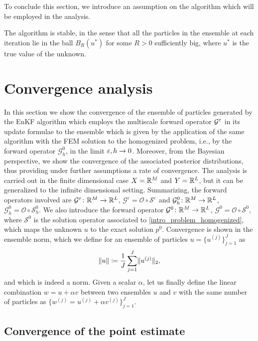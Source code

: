 To conclude this section, we introduce an assumption on the algorithm which will be employed in the analysis.
\begin{assumption} \label{ass_algo} The algorithm is stable, in the sense that all the particles in the ensemble at each iteration lie in the ball $B_R(u^*)$ for some $R > 0$ sufficiently big, where $u^*$ is the true value of the unknown.
\end{assumption}

\section{Convergence analysis}\label{Convergence}

In this section we show the convergence of the ensemble of particles generated by the EnKF algorithm which employs the multiscale forward operator $\mathcal G^\varepsilon$ in its update formulae to the ensemble which is given by the application of the same algorithm with the FEM solution to the homogenized problem, i.e., by the forward operator $\mathcal G^0_h$, in the limit $\varepsilon, h \to 0$. Moreover, from the Bayesian perspective, we show the convergence of the associated posterior distributions, thus providing under further assumptions a rate of convergence. The analysis is carried out in the finite dimensional case $X = \mathbb{R}^M$ and $Y = \mathbb{R}^L$, but it can be generalized to the infinite dimensional setting. Summarizing, the forward operators involved are $\mathcal{G}^{\varepsilon} \colon \mathbb{R}^M \to \mathbb{R}^L$, $\mathcal{G}^{\varepsilon} = \mathcal{O} \circ \mathcal{S}^{\varepsilon}$ and $\mathcal{G}^0_h \colon \mathbb{R}^M \to \mathbb{R}^L$, $\mathcal{G}^0_h = \mathcal{O} \circ \mathcal{S}^0_h$. We also introduce the forward operator $\mathcal{G}^0 \colon \mathbb{R}^M \to \mathbb{R}^L$, $\mathcal{G}^0 = \mathcal{O} \circ \mathcal{S}^0$, where $\mathcal{S}^0$ is the solution operator associated to \eqref{intro_problem_homogenized}, which maps the unknown $u$ to the exact solution $p^0$. Convergence is shown in the ensemble norm, which we define for an ensemble of particles $u = \{ u^{(j)} \}_{j = 1}^J$ as
\begin{equation} \label{ensemble_norm}
	\lVert u\rVert \coloneqq \frac{1}{J} \sum_{j=1}^J \lVert u^{(j)}\rVert_2,
\end{equation}
and which is indeed a norm. Given a scalar $\alpha$, let us finally define the linear combination $w = u + \alpha v$ between two ensembles $u$ and $v$ with the same number of particles as $\{w^{(j)} = u^{(j)} + \alpha v^{(j)}\}_{j=1}^J$.

\subsection{Convergence of the point estimate}


